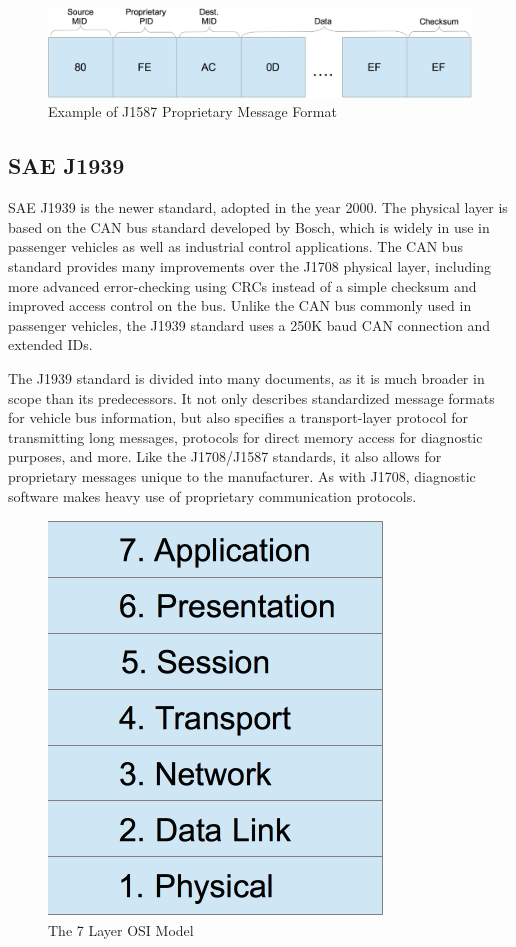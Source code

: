 \begin{figure}[h]
  \centering
  \includegraphics[scale=0.6]{J1708Proprietary}
  \caption{Example of J1587 Proprietary Message Format}
  \label{fig:j1587-proprietary}
\end{figure}

\subsection{SAE J1939}

SAE J1939\cite{J1939-71} is the newer standard, adopted in the year 2000. The physical layer is based on the CAN bus standard developed by Bosch, which is widely in use
in passenger vehicles as well as industrial control applications. The CAN bus standard provides many improvements over the J1708 physical layer,
including more advanced error-checking using CRCs instead of a simple checksum and improved access control on the bus. Unlike the CAN bus commonly used in
passenger vehicles, the J1939 standard uses a 250K baud CAN connection and extended IDs.

The J1939 standard is divided into many documents, as it is much broader in scope than its predecessors. It not only describes standardized
message formats for vehicle bus information, but also specifies a transport-layer protocol for transmitting long messages, protocols for
direct memory access for diagnostic purposes, and more. Like the J1708/J1587 standards, it also allows for proprietary messages unique
to the manufacturer. As with J1708, diagnostic software makes heavy use of proprietary communication protocols.

\begin{figure}[h]
  \centering
  \includegraphics{OSIModel}
  \caption{The 7 Layer OSI Model\cite{Day1983}}
  \label{fig:osimodel}
\end{figure}

